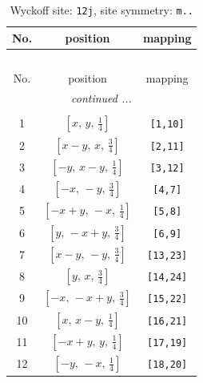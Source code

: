 \documentclass[fleqn,8pt]{jsarticle}
\begin{document}
\begin{longtable}{ccc}
\caption{Wyckoff site: {\tt 12j}, site symmetry: {\tt m..}}
 \\
 \hline \hline
No. & position & mapping \\ \hline \endfirsthead

\multicolumn{2}{l}{\tablename\ \thetable{}} \\
 \hline \hline
No. & position & mapping \\ \hline \endhead

 \hline \hline
\multicolumn{2}{r}{\footnotesize\it continued ...} \\ \endfoot

 \hline \hline
\multicolumn{2}{r}{} \\ \endlastfoot

1 & $\left[ x,\, y,\, \frac{1}{4} \right]$ & {\tt [1,10]} \\ \hline
2 & $\left[ x - y,\, x,\, \frac{3}{4} \right]$ & {\tt [2,11]} \\ \hline
3 & $\left[ - y,\, x - y,\, \frac{1}{4} \right]$ & {\tt [3,12]} \\ \hline
4 & $\left[ - x,\, - y,\, \frac{3}{4} \right]$ & {\tt [4,7]} \\ \hline
5 & $\left[ - x + y,\, - x,\, \frac{1}{4} \right]$ & {\tt [5,8]} \\ \hline
6 & $\left[ y,\, - x + y,\, \frac{3}{4} \right]$ & {\tt [6,9]} \\ \hline
7 & $\left[ x - y,\, - y,\, \frac{3}{4} \right]$ & {\tt [13,23]} \\ \hline
8 & $\left[ y,\, x,\, \frac{3}{4} \right]$ & {\tt [14,24]} \\ \hline
9 & $\left[ - x,\, - x + y,\, \frac{3}{4} \right]$ & {\tt [15,22]} \\ \hline
10 & $\left[ x,\, x - y,\, \frac{1}{4} \right]$ & {\tt [16,21]} \\ \hline
11 & $\left[ - x + y,\, y,\, \frac{1}{4} \right]$ & {\tt [17,19]} \\ \hline
12 & $\left[ - y,\, - x,\, \frac{1}{4} \right]$ & {\tt [18,20]} \\
\end{longtable}
\renewcommand{\arraystretch}{1.2}
\end{document}
